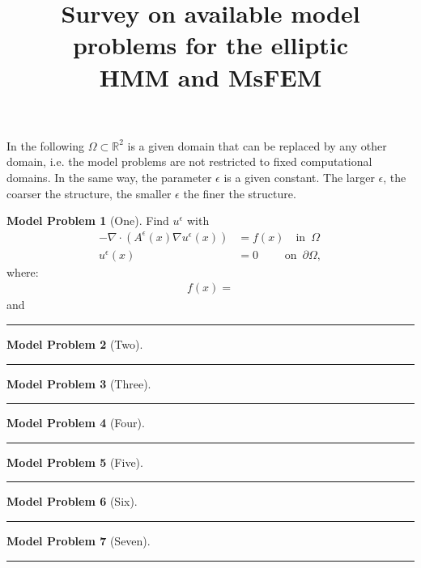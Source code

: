 \documentclass[a4paper,11pt]{article}
\title{Survey on available model problems for the elliptic\\ HMM and MsFEM}
\theoremstyle{definition}
\newtheorem{modelproblem}{Model Problem} %
\begin{document}
\maketitle

In the following $\Omega \subset \mathbb{R}^2$ is a given domain that can be replaced by any other domain, i.e. the model problems are not restricted to fixed computational domains. In the same way, the parameter $\epsilon$ is a given constant. The larger $\epsilon$, the coarser the structure, the smaller $\epsilon$ the finer the structure.

\begin{modelproblem}[One]
Find $u^{\epsilon}$ with
\begin{align*}
- \nabla \cdot \left( A^{\epsilon}(x) \nabla u^{\epsilon}(x) \right) &= f(x) \quad \mbox{in} \enspace \Omega \\
u^{\epsilon}(x) &= 0 \hspace{28pt} \mbox{on} \enspace \partial \Omega,
\end{align*}
where:
\begin{align*}
f(x) = 
\end{align*}
and
\end{modelproblem}
\hrule

\begin{modelproblem}[Two]

\end{modelproblem}
\hrule

\begin{modelproblem}[Three]

\end{modelproblem}
\hrule

\begin{modelproblem}[Four]

\end{modelproblem}
\hrule

\begin{modelproblem}[Five]

\end{modelproblem}
\hrule

\begin{modelproblem}[Six]

\end{modelproblem}
\hrule


\begin{modelproblem}[Seven]

\end{modelproblem}
\hrule
\end{document}
